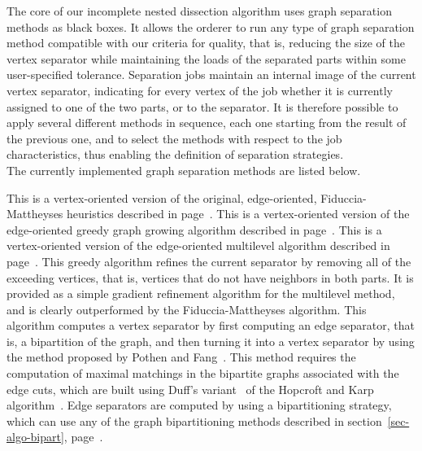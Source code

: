 The core of our incomplete nested dissection algorithm uses graph separation
methods as black boxes. It allows the orderer to run any type of graph
separation method compatible with our criteria for quality, that is,
reducing the size of the vertex separator while maintaining the loads of
the separated parts within some user-specified tolerance.
Separation jobs maintain an internal image of the current vertex separator,
indicating for every vertex of the job whether it is currently assigned to
one of the two parts, or to the separator.
It is therefore possible to apply several different methods in sequence,
each one starting from the result of the previous one,
and to select the methods with respect to the job characteristics, thus
enabling the definition of separation strategies.
\\

The currently implemented graph separation methods are listed below.
\begin{itemize}
This is a vertex-oriented version of the original, edge-oriented,
Fiduccia-Mattheyses heuristics described in page~\pageref{sec-algo-fme}.
This is a vertex-oriented version of the edge-oriented
greedy graph growing algorithm described in page~\pageref{sec-algo-ggge}.
This is a vertex-oriented version of the edge-oriented
multilevel algorithm described in page~\pageref{sec-algo-mle}.
This greedy algorithm refines the current separator by removing all of
the exceeding vertices, that is, vertices that do not have neighbors
in both parts. It is provided as a simple gradient refinement
algorithm for the multilevel method, and is clearly outperformed by
the Fiduccia-Mattheyses algorithm.
This algorithm computes a vertex separator by first computing an edge
separator, that is, a bipartition of the graph, and then turning it
into a vertex separator by using the method proposed by Pothen and
Fang~\cite{pofa90}. This method requires the computation of maximal
matchings in the bipartite graphs associated with the edge cuts, which
are built using Duff's variant~\cite{duff81} of the Hopcroft and Karp
algorithm~\cite{hoka73}.
Edge separators are computed by using a bipartitioning strategy,
which can use any of the graph bipartitioning methods described in
section~\ref{sec-algo-bipart}, page~\pageref{sec-algo-bipart}.
\end{itemize}
